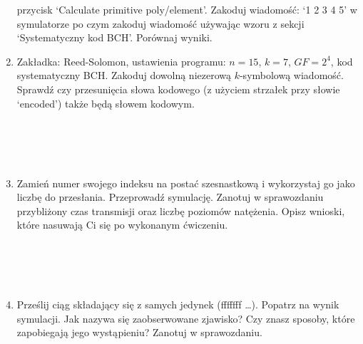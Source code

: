 \begin{enumerate}
    przycisk `Calculate primitive poly/element'.
    Zakoduj wiadomość: `1 2 3 4 5' w symulatorze po czym zakoduj wiadomość
    używając wzoru z sekcji `Systematyczny kod BCH'. Porównaj wyniki.
    \newpage
    \item Zakładka: Reed-Solomon, ustawienia programu: $n = 15$, $k=7$, $GF = 2^4$,
    kod systematyczny BCH.
    Zakoduj dowolną niezerową $k$-symbolową wiadomość. Sprawdź czy przesunięcia słowa kodowego
    (z użyciem strzałek przy słowie `encoded') także będą słowem kodowym. \\ \\ \\ \\ \\
    \item Zamień numer swojego indeksu na postać szesnastkową i wykorzystaj go jako liczbę do przesłania. Przeprowadź symulację. Zanotuj w sprawozdaniu
    przybliżony czas transmisji oraz liczbę poziomów natężenia. Opisz wnioski, które nasuwają Ci się po wykonanym ćwiczeniu.  \\ \\ \\ \\ \\
    \item Prześlij ciąg składający się z samych jedynek (fffffff \dots). Popatrz na wynik symulacji. Jak nazywa się zaobserwowane zjawisko? Czy znasz sposoby,
    które zapobiegają jego wystąpieniu? Zanotuj w sprawozdaniu.
\end{enumerate}
